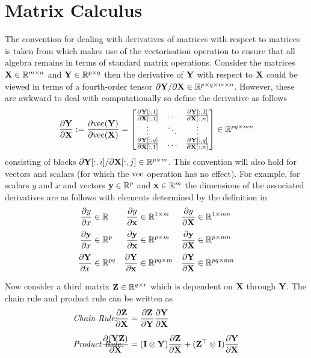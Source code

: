 \section{Matrix Calculus} \label{app:matcal}
The convention for dealing with derivatives of matrices with respect to matrices is taken from \cite{Bro05} which makes use of the vectorisation operation to ensure that all algebra remains in terms of standard matrix operations.
Consider the matrices $\mathbf{X} \in \mathbb{R}^{m\times n}$ and $\mathbf{Y} \in \mathbb{R}^{p\times q}$ then the derivative of $\mathbf{Y}$ with respect to $\mathbf{X}$ could be viewed in terms of a fourth-order tensor $\mathrm{\partial}\mathbf{Y}/\mathrm{\partial}\mathbf{X} \in \mathbb{R}^{p\times q \times m\times n}$. However, these are awkward to deal with computationally so define the derivative as follows
\begin{equation}
\frac{\mathrm{\partial} \mathbf{Y}}{\mathrm{\partial} \mathbf{X}} := \frac{\mathrm{\partial} \mathrm{vec}(\mathbf{Y})}{\mathrm{\partial} \mathrm{vec}(\mathbf{X})} = 
\begin{bmatrix}
\frac{\mathrm{\partial} \mathbf{Y}[:,1]}{\mathrm{\partial} \mathbf{X}[:,1]} & \dots & \frac{\mathrm{\partial} \mathbf{Y}[:,1]}{\mathrm{\partial} \mathbf{X}[:,n]} \\
\vdots & \ddots & \vdots \\
\frac{\mathrm{\partial} \mathbf{Y}[:,q]}{\mathrm{\partial} \mathbf{X}[:,1]} & \dots & \frac{\mathrm{\partial} \mathbf{Y}[:,q]}{\mathrm{\partial} \mathbf{X}[:,n]}
\end{bmatrix}
\in \mathbb{R}^{pq \times mn}
\label{eqn:dvecdvec}
\end{equation}
consisting of blocks $\partial\mathbf{Y}[:,i]/\partial\mathbf{X}[:,j] \in \mathbb{R}^{p\times m}$. This convention will also hold for vectors and scalars (for which the $\mathrm{vec}$ operation has no effect). For example, for scalars $y$ and $x$ and vectors $\mathbf{y} \in \mathbb{R}^p$ and $\mathbf{x} \in \mathbb{R}^m$ the dimensions of the associated derivatives are as follows with elements determined by the definition in 
\begin{align*}
\frac{\mathrm{\partial} y}{\mathrm{\partial} x} &\in \mathbb{R} &
\frac{\mathrm{\partial} y}{\mathrm{\partial} \mathbf{x}} &\in \mathbb{R}^{1\times m} &
\frac{\mathrm{\partial} y}{\mathrm{\partial} \mathbf{X}} &\in \mathbb{R}^{1\times mn}
\\[0.1cm]
\frac{\mathrm{\partial} \mathbf{y}}{\mathrm{\partial} x} &\in \mathbb{R}^{p} &
\frac{\mathrm{\partial} \mathbf{y}}{\mathrm{\partial} \mathbf{x}} &\in \mathbb{R}^{p\times m} &
\frac{\mathrm{\partial} \mathbf{y}}{\mathrm{\partial} \mathbf{X}} &\in \mathbb{R}^{p\times mn}
\\[0.1cm]
\frac{\mathrm{\partial} \mathbf{Y}}{\mathrm{\partial} x} &\in \mathbb{R}^{pq} &
\frac{\mathrm{\partial} \mathbf{Y}}{\mathrm{\partial} \mathbf{x}} &\in \mathbb{R}^{pq\times m} &
\frac{\mathrm{\partial} \mathbf{Y}}{\mathrm{\partial} \mathbf{X}} &\in \mathbb{R}^{pq\times mn}
\end{align*}

Now consider a third matrix $\mathbf{Z} \in \mathbb{R}^{q\times r}$ which is dependent on $\mathbf{X}$ through $\mathbf{Y}$. The chain rule and product rule can be written as
\begin{align}
&\text{\it Chain Rule: } & 
\!\!\!\!\!\!\!\!\!\!\!\!\!\!\!\!\!\!\!\!\!\!\!\!
\pdiff{\bZ}{\bX} &= \pdiff{\bZ}{\bY}\pdiff{\bY}{\bX} \\[0.2cm]
&\text{\it Product Rule: } & 
\!\!\!\!\!\!\!\!\!\!\!\!\!\!\!\!\!\!\!\!\!\!\!\!
\pdiff{(\bY\bZ)}{\bX} &= (\bI\otimes\bY)\pdiff{\bZ}{\bX} + (\bZ^\top\otimes\bI)\pdiff{\bY}{\bX}
\end{align}

